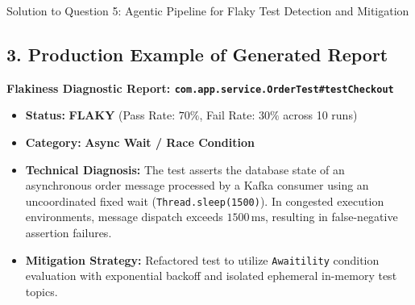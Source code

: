 \documentclass[11pt,a4paper]{article}
\begin{document}
\begin{solutionbox}{Solution to Question 5: Agentic Pipeline for Flaky Test Detection and Mitigation}
\subsection*{3. Production Example of Generated Report}
\begin{tcolorbox}[colback=white,colframe=secondary,arc=2mm,title=\textbf{Sample Final Flakiness Report Produced by Pipeline}]
\textbf{\large Flakiness Diagnostic Report: \texttt{com.app.service.OrderTest\#testCheckout}}
\begin{itemize}[leftmargin=1.2em,itemsep=2pt]
    \item \textbf{Status:} \textcolor{accentred}{\textbf{FLAKY}} (Pass Rate: $70\%$, Fail Rate: $30\%$ across 10 runs)
    \item \textbf{Category:} \textbf{Async Wait / Race Condition}
    \item \textbf{Technical Diagnosis:} The test asserts the database state of an asynchronous order message processed by a Kafka consumer using an uncoordinated fixed wait (\texttt{Thread.sleep(1500)}). In congested execution environments, message dispatch exceeds $1500\,\text{ms}$, resulting in false-negative assertion failures.
    \item \textbf{Mitigation Strategy:} Refactored test to utilize \texttt{Awaitility} condition evaluation with exponential backoff and isolated ephemeral in-memory test topics.
\end{itemize}
\end{tcolorbox}
\end{solutionbox}

\vspace{0.4cm}
\end{document}
